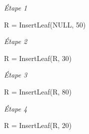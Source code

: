 \documentclass[11pt,a4paper]{article}
\begin{document}
\begin{center}




\begin{table}[ht!]
  \centering
  \begin{minipage}{0.33\textwidth}
    \centering

\textit{\'Etape 1}

R = InsertLeaf(NULL, 50)

\vspace*{2.75cm}

  \end{minipage}
  \hfillx
  \begin{minipage}{0.33\textwidth}
    \centering

\textit{\'Etape 2}

R = InsertLeaf(R, 30)

\vspace*{2.75cm}

  \end{minipage}
  \hfillx
  \begin{minipage}{0.33\textwidth}
    \centering

\textit{\'Etape 3}

R = InsertLeaf(R, 80)

\vspace*{2.75cm}

  \end{minipage}
\end{table}

\clearpage


\begin{table}[ht!]
  \centering
  \begin{minipage}{0.33\textwidth}
    \centering

\textit{\'Etape 4}

R = InsertLeaf(R, 20)

\vspace*{6cm}

  \end{minipage}
  \hfillx
  \begin{minipage}{0.33\textwidth}
    \centering


\end{minipage}
\end{table}
\end{center}
\end{document}
